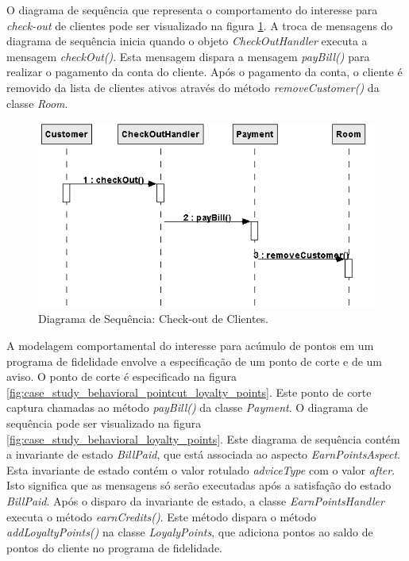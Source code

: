 O diagrama de sequência que representa o comportamento do interesse para \textit{check-out} de clientes pode ser visualizado na figura
\ref{fig:case_study_behavioral_check_out}. A troca de mensagens do diagrama de sequência inicia quando o objeto \textit{CheckOutHandler} executa a
mensagem \textit{checkOut()}. Esta mensagem dispara a mensagem \textit{payBill()} para realizar o pagamento da conta do cliente. Após o pagamento da
conta, o cliente é removido da lista de clientes ativos através do método \textit{removeCustomer()} da classe \textit{Room}.

  \begin{figure}
	\centering
	\includegraphics{img/case_study_behavioral_check_out.png}
	\caption{Diagrama de Sequência: Check-out de Clientes.}\label{fig:case_study_behavioral_check_out}
  \end{figure}
  
A modelagem comportamental do interesse para acúmulo de pontos em um programa de fidelidade envolve a especificação de um ponto de corte e de um
aviso. O ponto de corte é especificado na figura \ref{fig:case_study_behavioral_pointcut_loyalty_points}. Este ponto de corte captura chamadas ao
método \textit{payBill()} da classe \textit{Payment}. O diagrama de sequência pode ser visualizado na figura
\ref{fig:case_study_behavioral_loyalty_points}. Este diagrama de sequência contém a invariante de estado \textit{BillPaid}, que está associada ao
aspecto \textit{EarnPointsAspect}. Esta invariante de estado contém o valor rotulado \textit{adviceType} com o valor \textit{after}. Isto significa que as
mensagens só serão executadas após a satisfação do estado \textit{BillPaid}. Após o disparo da invariante de estado, a classe
\textit{EarnPointsHandler} executa o método \textit{earnCredits()}. Este método dispara o método \textit{addLoyaltyPoints()} na classe
\textit{LoyalyPoints}, que adiciona pontos ao saldo de pontos do cliente no programa de fidelidade.
  
